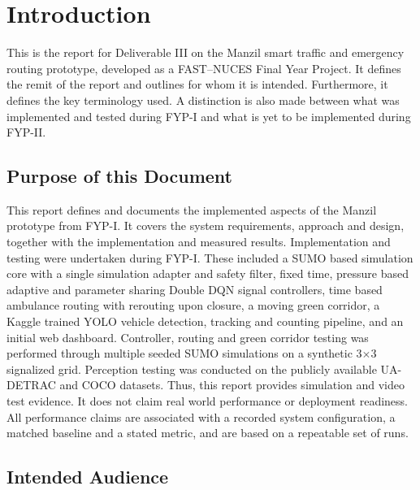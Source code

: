 \chapter{Introduction}
\label{ch:introduction}

This is the report for Deliverable III on the Manzil smart traffic and emergency routing prototype, developed as a FAST--NUCES Final Year Project. It defines the remit of the report and outlines for whom it is intended. Furthermore, it defines the key terminology used. A distinction is also made between what was implemented and tested during FYP-I and what is yet to be implemented during FYP-II.

\section{Purpose of this Document}

This report defines and documents the implemented aspects of the Manzil prototype from FYP-I. It covers the system requirements, approach and design, together with the implementation and measured results. Implementation and testing were undertaken during FYP-I. These included a SUMO based simulation core with a single simulation adapter and safety filter, fixed time, pressure based adaptive and parameter sharing Double DQN signal controllers, time based ambulance routing with rerouting upon closure, a moving green corridor, a Kaggle trained YOLO vehicle detection, tracking and counting pipeline, and an initial web dashboard. Controller, routing and green corridor testing was performed through multiple seeded SUMO simulations on a synthetic 3$\times$3 signalized grid. Perception testing was conducted on the publicly available UA-DETRAC and COCO datasets. Thus, this report provides simulation and video test evidence. It does not claim real world performance or deployment readiness. All performance claims are associated with a recorded system configuration, a matched baseline and a stated metric, and are based on a repeatable set of runs.

\section{Intended Audience}


